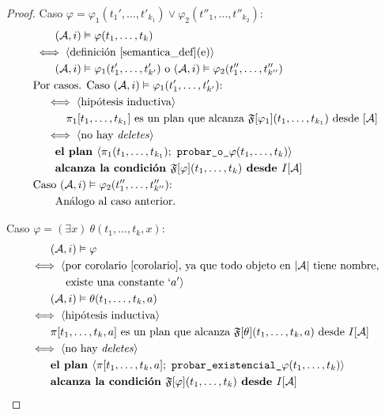 \begin{proof}
Caso $\varphi = \varphi_1(t_1',\ldots,t'_{k_1}) \lor \varphi_2(t''_1,\ldots,t''_{k_2}) $:
\begin{alignat*}{1}
& \quad \quad (\mathcal{A}, i) \vDash \varphi(t_1,\ldots,t_k)\\
& \iff \langle \text{definición \ref{semantica_def}(e)} \rangle\\
& \quad \quad (\mathcal{A}, i) \vDash \varphi_1(t'_1,\ldots,t'_{k'}) 
\text{ o } (\mathcal{A}, i) \vDash \varphi_2(t''_1,\ldots,t''_{k''})\\
& \text{Por casos. Caso $(\mathcal{A}, i) \vDash \varphi_1(t'_1,\ldots,t'_{k'})$:}\\
& \quad \iff \langle \text{hipótesis inductiva} \rangle\\
& \quad \quad \quad \pi_1[t_1,\ldots,t_{k_1}] \text{ es un plan que alcanza 
$\mathfrak{F}[\varphi_1](t_1,\ldots,t_{k_1})$ desde $[\mathcal{A}]$}\\
& \quad \iff \langle \text{no hay \textit{deletes}} \rangle\\
& \quad \quad \textbf{el plan } \langle \pi_1(t_1,\ldots,t_{k_1});\
\texttt{probar\_o\_}\varphi(t_1,\ldots,t_k) \rangle \\
& \quad \quad \textbf{alcanza la condición }
\mathfrak{F}[\varphi](t_1,\ldots,t_k) \textbf{ desde } I[\mathcal{A}]\\
& \text{Caso $(\mathcal{A}, i) \vDash \varphi_2(t''_1,\ldots,t''_{k''})$:}\\
& \quad \quad \text{Análogo al caso anterior.}
\end{alignat*}

Caso $\varphi = (\exists x)\ \theta(t_1,\ldots,t_k,x):$
\begin{alignat*}{1}
& \quad \quad (\A, i) \models \varphi\\
& \iff \langle \text{por corolario \ref{corolario}, ya que todo objeto en $|\A|$
tiene nombre, }\\
& {\color{white} \iff \langle} \text{ existe una constante } `a' \rangle\\
& \quad \quad (\A, i) \models \theta(t_1,\ldots,t_k,a)\\
& \iff \tup{\text{hipótesis inductiva}}\\
& \quad \quad \pi[t_1,\ldots,t_k,a] \text{ es un plan que alcanza }
\FT[\theta](t_1,\ldots,t_k,a) \text{ desde } I[\A]\\
& \iff \tup{\text{no hay \textit{deletes}}}\\
& \quad \quad \textbf{el plan } \langle \pi[t_1,\ldots,t_k,a];\
\texttt{probar\_existencial\_}\varphi(t_1,\ldots,t_k)\rangle\\
& \quad \quad \textbf{alcanza la condición } \FT[\varphi](t_1,\ldots,t_k)
\textbf{ desde } I[\A]
\end{alignat*}


\end{proof}
